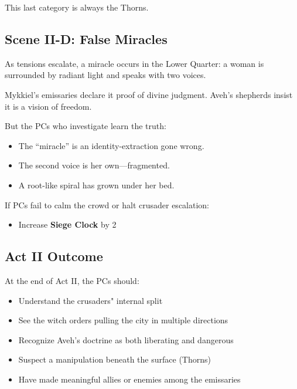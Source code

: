 \documentclass[11pt]{book}
\begin{document}
This last category is always the Thorns.

\subsection*{Scene II-D: False Miracles}

As tensions escalate, a miracle occurs in the Lower Quarter:  
a woman is surrounded by radiant light and speaks with two voices.

Mykkiel's emissaries declare it proof of divine judgment.  
Aveh's shepherds insist it is a vision of freedom.

But the PCs who investigate learn the truth:
\begin{itemize}[leftmargin=*]
    \item The ``miracle'' is an identity-extraction gone wrong.
    \item The second voice is her own---fragmented.
    \item A root-like spiral has grown under her bed.
\end{itemize}

If PCs fail to calm the crowd or halt crusader escalation:
\begin{itemize}
    \item Increase \textbf{Siege Clock} by 2
\end{itemize}

\subsection*{Act II Outcome}

At the end of Act II, the PCs should:
\begin{itemize}[leftmargin=*]
    \item Understand the crusaders" internal split
    \item See the witch orders pulling the city in multiple directions
    \item Recognize Aveh's doctrine as both liberating and dangerous
    \item Suspect a manipulation beneath the surface (Thorns)
    \item Have made meaningful allies or enemies among the emissaries
\end{itemize}
\end{document}
